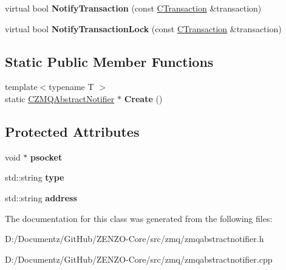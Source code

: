 \begin{DoxyCompactItemize}
\item 
\mbox{\label{class_c_z_m_q_abstract_notifier_a91809065c7bf730a5f2144e2424b7d8f}} 
virtual bool {\bfseries Notify\+Transaction} (const \mbox{\hyperlink{class_c_transaction}{C\+Transaction}} \&transaction)
\item 
\mbox{\label{class_c_z_m_q_abstract_notifier_a249ef399ed514c38b941cdb516fecb55}} 
virtual bool {\bfseries Notify\+Transaction\+Lock} (const \mbox{\hyperlink{class_c_transaction}{C\+Transaction}} \&transaction)
\end{DoxyCompactItemize}
\subsection*{Static Public Member Functions}
\begin{DoxyCompactItemize}
\item 
\mbox{\label{class_c_z_m_q_abstract_notifier_adf9df04ae4c55a55bcf7a9e85f30b481}} 
{\footnotesize template$<$typename T $>$ }\\static \mbox{\hyperlink{class_c_z_m_q_abstract_notifier}{C\+Z\+M\+Q\+Abstract\+Notifier}} $\ast$ {\bfseries Create} ()
\end{DoxyCompactItemize}
\subsection*{Protected Attributes}
\begin{DoxyCompactItemize}
\item 
\mbox{\label{class_c_z_m_q_abstract_notifier_a4cad2310e9e6d791ce27268881eb82cf}} 
void $\ast$ {\bfseries psocket}
\item 
\mbox{\label{class_c_z_m_q_abstract_notifier_a7e8bab88a7f858433cb3ba7f5ce3f793}} 
std\+::string {\bfseries type}
\item 
\mbox{\label{class_c_z_m_q_abstract_notifier_a7b316c5ca39f6a5e2297de163eb23d53}} 
std\+::string {\bfseries address}
\end{DoxyCompactItemize}


The documentation for this class was generated from the following files\+:\begin{DoxyCompactItemize}
\item 
D\+:/\+Documentz/\+Git\+Hub/\+Z\+E\+N\+Z\+O-\/\+Core/src/zmq/zmqabstractnotifier.\+h\item 
D\+:/\+Documentz/\+Git\+Hub/\+Z\+E\+N\+Z\+O-\/\+Core/src/zmq/zmqabstractnotifier.\+cpp\end{DoxyCompactItemize}
